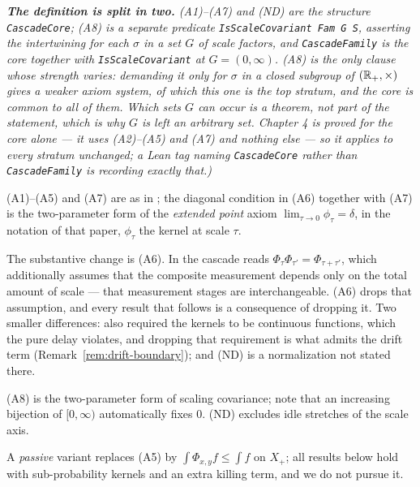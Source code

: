 \begin{definition}
\emph{\textbf{The definition is split in two.} (A1)--(A7) and (ND) are the structure
\texttt{CascadeCore}; (A8) is a separate predicate
\texttt{IsScaleCovariant Fam G S}, asserting the intertwining for each $\sigma$ in a set
$G$ of scale factors, and \texttt{CascadeFamily} is the core together with
\texttt{IsScaleCovariant} at $G = (0,\infty)$. (A8) is the only clause whose strength varies:
demanding it only for $\sigma$ in a closed subgroup of $(\mathbb{R}_+, \times)$ gives a weaker axiom
system, of which this one is the top stratum, and the core is common to all of them. Which sets
$G$ can occur is a theorem, not part of the statement, which is why $G$ is left an arbitrary
set. Chapter 4 is proved for the core alone --- it uses (A2)--(A5) and (A7) and nothing else
--- so it applies to every stratum unchanged; a Lean tag naming
\texttt{CascadeCore} rather than \texttt{CascadeFamily} is recording exactly that.)}
\end{definition}

\begin{remark}\label{rem:axiom-provenance}
(A1)--(A5) and (A7) are as in ; the diagonal condition in (A6)
together with (A7) is the two-parameter form of the \emph{extended point} axiom
$\lim_{\tau\to 0}\phi_\tau = \delta$, in the notation of that paper, $\phi_\tau$ the kernel
at scale $\tau$.

The substantive change is (A6). In  the cascade reads
$\Phi_\tau \Phi_{\tau'} = \Phi_{\tau + \tau'}$, which additionally assumes that the composite
measurement depends only on the total amount of scale --- that measurement stages are
interchangeable. (A6) drops that assumption, and every result that follows is a
consequence of dropping it. Two smaller differences:  also
required the kernels to be continuous functions, which the pure delay violates, and
dropping that requirement is what admits the drift term (Remark~\ref{rem:drift-boundary});
and (ND) is a normalization not stated there.

(A8) is the two-parameter form of scaling covariance; note that an increasing bijection of
$[0,\infty)$ automatically fixes $0$. (ND) excludes idle stretches of the scale axis.

A \emph{passive} variant replaces (A5) by $\int \Phi_{x,y} f \le \int f$ on $X_+$; all results
below hold with sub-probability kernels and an extra killing term, and we do not pursue it.
\end{remark}

